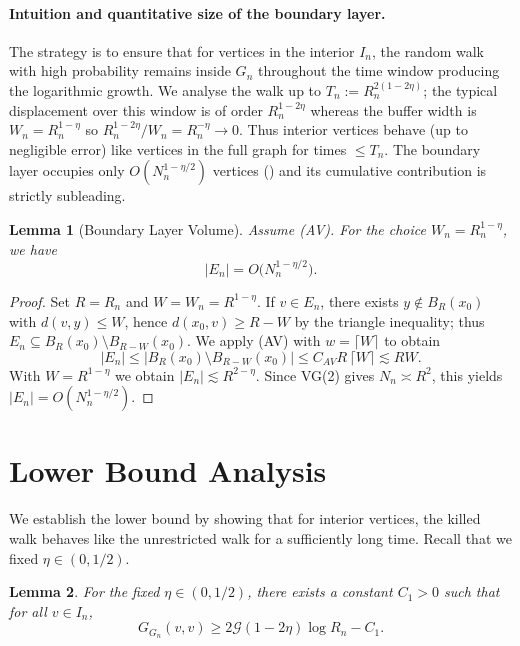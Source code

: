 \documentclass[reqno]{amsart}
\numberwithin{equation}{section}
\newtheorem{lemma}[lemma]{Lemma}
\theoremstyle{definition}
\theoremstyle{remark}
\newcommand{\cG}{\mathcal{G}}
\begin{document}
\paragraph{Intuition and quantitative size of the boundary layer.} The strategy is to ensure that for vertices in the interior $I_n$, the random walk with high probability remains inside $G_n$ throughout the time window producing the logarithmic growth. We analyse the walk up to $T_n:=R_n^{2(1-2\eta)}$; the typical displacement over this window is of order $R_n^{1-2\eta}$ whereas the buffer width is $W_n=R_n^{1-\eta}$ so $R_n^{1-2\eta}/W_n=R_n^{-\eta}\to0$. Thus interior vertices behave (up to negligible error) like vertices in the full graph for times $\le T_n$. The boundary layer occupies only $O(N_n^{1-\eta/2})$ vertices () and its cumulative contribution is strictly subleading.

\begin{lemma}[Boundary Layer Volume]\label{lem:boundary_volume}
Assume (AV). For the choice $W_n = R_n^{1-\eta}$, we have
\[
    |E_n| = O\bigl(N_n^{1-\eta/2}\bigr).
\]
\end{lemma}
\begin{proof}
Set $R=R_n$ and $W=W_n=R^{1-\eta}$. If $v\in E_n$, there exists $y\notin B_R(x_0)$ with $d(v,y)\le W$, hence
$d(x_0,v)\ge R-W$ by the triangle inequality; thus $E_n\subseteq B_R(x_0)\setminus B_{R-W}(x_0)$.
We apply (AV) with $w=\lceil W\rceil$ to obtain
\[
  |E_n|\le |B_R(x_0)\setminus B_{R-W}(x_0)|\le C_{AV} R\,\lceil W\rceil\lesssim R W.
\]
With $W=R^{1-\eta}$ we obtain $|E_n|\lesssim R^{2-\eta}$. Since VG(2) gives $N_n\asymp R^2$, this yields $|E_n|=O(N_n^{1-\eta/2})$.
\end{proof}

\section{Lower Bound Analysis}\label{sec:lower_bound}

We establish the lower bound by showing that for interior vertices, the killed walk behaves like the unrestricted walk for a sufficiently long time.
Recall that we fixed $\eta \in (0, 1/2)$.

\begin{lemma}\label{lem:lower}
For the fixed $\eta \in (0,1/2)$, there exists a constant $C_1 > 0$ such that for all $v \in I_n$,
\[
G_{G_n}(v,v) \geq 2\cG(1-2\eta)\log R_n - C_1.
\]
\end{lemma}
\end{document}
